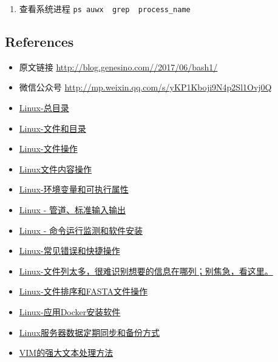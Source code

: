 \documentclass[]{article}
\providecommand{\tightlist}{%
  \setlength{\itemsep}{0pt}\setlength{\parskip}{0pt}}
\numberwithin{figure}{section}
\numberwithin{table}{section}
\begin{document}
\begin{enumerate}
\def\labelenumi{\arabic{enumi}.}
\setcounter{enumi}{2}
\tightlist
\item
  查看系统进程 \texttt{ps\ auwx\ \textbar{}\ grep\ \ \textquotesingle{}process\_name\textquotesingle{}}
\end{enumerate}

\hypertarget{references}{%
\subsection{References}\label{references}}

\begin{itemize}
\tightlist
\item
  原文链接 \url{http://blog.genesino.com//2017/06/bash1/}
\item
  微信公众号 \url{http://mp.weixin.qq.com/s/yKP1Kboji9N4p2Sl1Ovj0Q}
\item
  \href{http://mp.weixin.qq.com/s/hEYU80fPf1eD5OWL3fO4Bg}{Linux-总目录}
\item
  \href{http://mp.weixin.qq.com/s/yKP1Kboji9N4p2Sl1Ovj0Q}{Linux-文件和目录}
\item
  \href{http://mp.weixin.qq.com/s/4bYMzJclf_xHpqdrlbvAdA}{Linux-文件操作}
\item
  \href{http://mp.weixin.qq.com/s/QFgINAYcQA9kYYSA28wK-Q}{Linux文件内容操作}
\item
  \href{http://mp.weixin.qq.com/s/poFpNHQgHDr0qr2wqfVNdw}{Linux-环境变量和可执行属性}
\item
  \href{http://mp.weixin.qq.com/s/zL9Mw_2ig48gHrIjKM0CMw}{Linux - 管道、标准输入输出}
\item
  \href{http://mp.weixin.qq.com/s/TNU7X2mhfVVffaJ7NRBuNA}{Linux - 命令运行监测和软件安装}
\item
  \href{http://mp.weixin.qq.com/s/cDIN4_R4nETEB5irmIGFAQ}{Linux-常见错误和快捷操作}
\item
  \href{http://mp.weixin.qq.com/s/1QaroFE7AH1pREuq-k2YAw}{Linux-文件列太多，很难识别想要的信息在哪列；别焦急，看这里。}
\item
  \href{http://mp.weixin.qq.com/s/R1OHRhZoDJuAdyVdJr2xHg}{Linux-文件排序和FASTA文件操作}
\item
  \href{http://mp.weixin.qq.com/s/HLHiWMLaWtB7SOJe_jP3mA}{Linux-应用Docker安装软件}
\item
  \href{http://mp.weixin.qq.com/s/c2cspK5b4sQScWYMBtG63g}{Linux服务器数据定期同步和备份方式}
\item
  \href{https://mp.weixin.qq.com/s/4lUiZ60-aXLilRk9--iQhA}{VIM的强大文本处理方法}

\end{itemize}
\end{document}
